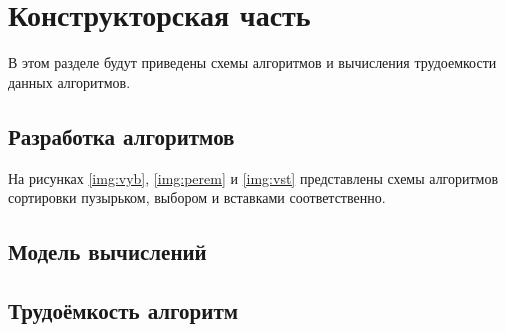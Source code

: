 \chapter{Конструкторская часть}
В этом разделе будут приведены схемы алгоритмов и вычисления трудоемкости данных алгоритмов.





\section{Разработка алгоритмов}

На рисунках  \ref{img:vyb}, \ref{img:perem} и \ref{img:vst} представлены схемы алгоритмов сортировки пузырьком, выбором и вставками соответственно.



\section{Модель вычислений}


\section{Трудоёмкость алгоритм}


